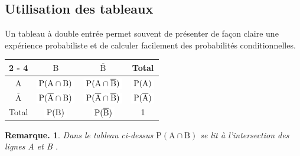 \documentclass[12pt]{article}
\theoremstyle{break}
\newtheorem*{remark}{Remarque.}
\begin{document}
\subsection{Utilisation des tableaux}

Un tableau à double entrée permet souvent de présenter de façon claire une expérience probabiliste et de calculer facilement des probabilités conditionnelles.

\begin{center}
\renewcommand{\arraystretch}{1.5}
\begin{tabular}{|c|c|c|c|}
\cline { 2 - 4 }
\multicolumn{1}{c|}{} & $\mathrm{B}$ & $\overline{\mathrm{B}}$ & Total \\
\hline
$\mathrm{A}$ & $\hideMW{\P(\mathrm{A} \cap \mathrm{B})}$ & $\hideMW{\P(\mathrm{A} \cap \overline{\mathrm{B}})}$ & $\hideMW{\P(\mathrm{A})}$ \\
\hline
$\overline{\mathrm{A}}$ & $\hideMW{\P(\overline{\mathrm{A}} \cap \mathrm{B})}$ & $\hideMW{\P(\overline{\mathrm{A}} \cap \overline{\mathrm{B}})}$ & $\hideMW{\P(\overline{\mathrm{A}})}$ \\
\hline
Total & $\hideMW{\P(\mathrm{B})}$ & $\hideMW{\P(\overline{\mathrm{B}})}$ & 1 \\
\hline
\end{tabular}
\end{center}


\begin{remark}
Dans le tableau ci-dessus $\mathrm{P}(\mathrm{A} \cap \mathrm{B})$ se lit à l'intersection des lignes A et B .

% 
\end{remark}
\end{document}

